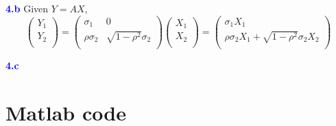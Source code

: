 \documentclass[a4paper,11pt] {article}
\begin{document}
\textcolor{blue}{\bf 4.b } Given $Y = AX$,
$$
\left(
  \begin{array}{c}
    Y_1 \\
    Y_2 \\
  \end{array}
\right)
=
\left(
  \begin{array}{cc}
    \sigma_1 & 0 \\
    \rho \sigma_2 & \sqrt{1-\rho^2}\sigma_2 \\
  \end{array}
\right)
\left(
  \begin{array}{c}
    X_1 \\
    X_2 \\
  \end{array}
\right)
=
\left(
  \begin{array}{c}
    \sigma_1 X_1 \\
    \rho \sigma_2 X_1 + \sqrt{1-\rho^2} \sigma_2 X_2 \\
  \end{array}
\right)
$$

\textcolor{blue}{\bf 4.c }

\section*{Matlab code}
\begin{spacing}{0.9}
%
\end{spacing}
\end{document}

